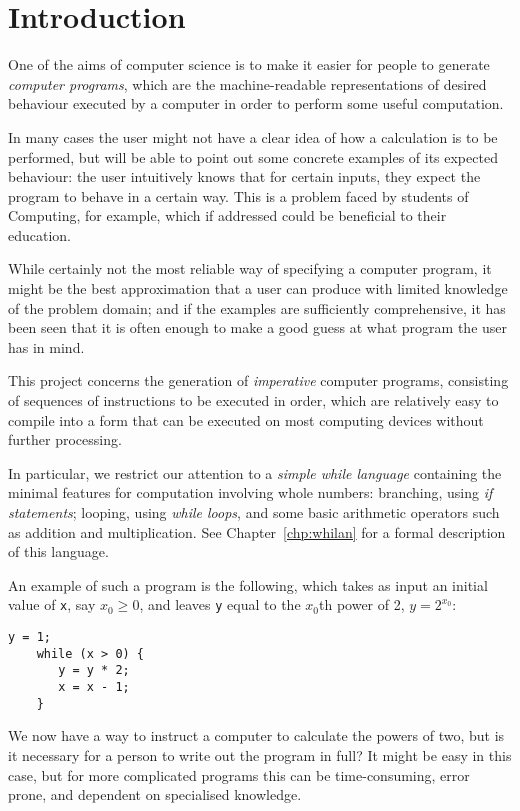 \documentclass[a4paper,twoside,notitlepage]{report}
\begin{document}
\chapter{Introduction} \label{chp:intro}

One of the aims of computer science is to make it easier for people to 
generate \emph{computer programs}, which are the machine-readable 
representations of desired behaviour executed by a computer in order to 
perform some useful computation.

In many cases the user might not have a clear idea of how a calculation is 
to be performed, but will be able to point out some concrete examples of 
its expected behaviour: the user intuitively knows that for certain 
inputs, they expect the program to behave in a certain way. This is a 
problem faced by students of Computing, for example, which if addressed 
could be beneficial to their education.

While certainly not the most reliable way of specifying a computer 
program, it might be the best approximation that a user can produce with 
limited knowledge of the problem domain; and if the examples are 
sufficiently comprehensive, it has been seen that it is often enough to 
make a good guess at what program the user has in mind.

This project concerns the generation of \emph{imperative} computer 
programs, consisting of sequences of instructions to be executed in order, 
which are relatively easy to compile into a form that can be executed on 
most computing devices without further processing.

In particular, we restrict our attention to a \emph{simple while language} 
containing the minimal features for computation involving whole numbers: 
branching, using \emph{if statements}; looping, using \emph{while loops}, 
and some basic arithmetic operators such as addition and multiplication.
See Chapter~\ref{chp:whilan} for a formal description of this language.

An example of such a program is the following, which takes as input an initial 
value of \texttt{x}, say $x_0 \ge 0$, and leaves \texttt{y} equal to the 
$x_0$th power of 2, $y = 2^{x_0}$:
\begin{Verbatim}[samepage=true]
    y = 1;
    while (x > 0) {
       y = y * 2;
       x = x - 1;
    }
\end{Verbatim}

We now have a way to instruct a computer to calculate the powers of two, 
but is it necessary for a person to write out the program in full? It 
might be easy in this case, but for more complicated programs this can be 
time-consuming, error prone, and dependent on specialised knowledge.
\end{document}
